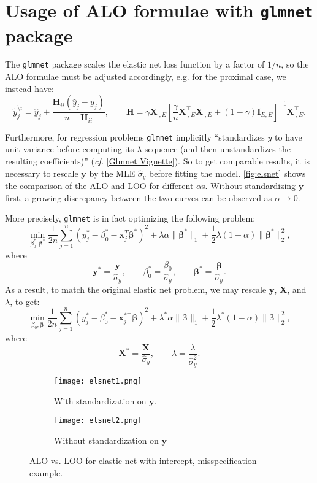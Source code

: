 \documentclass[11pt]{article}
\newcommand{\by}{\bm{y}}
\newcommand{\bH}{\bm{H}}
\newcommand{\bI}{\bm{I}}
\newcommand{\bX}{\bm{X}}
\newcommand{\bbeta}{\bm{\beta}}
\begin{document}
\section{Usage of ALO formulae with \texttt{glmnet} package}
The \verb|glmnet| package scales the elastic net loss function by a factor of \(1/n\), so the ALO formulae must be adjusted accordingly, e.g. for the proximal case, we instead have: \[\tilde{y}_j^{\setminus i}=\hat{y}_j+\frac{\bH_{ii}(\hat{y}_j-y_j)}{n-\bH_{ii}},\qquad\bH=\gamma\bX_{\cdot,E}\left[\frac{\gamma}{n}\bX_{\cdot,E}^\top\bX_{\cdot,E}+\left(1-\gamma\right)\bI_{E,E}\right]^{-1}\bX_{\cdot,E}^\top.\]

Furthermore, for regression problems \verb|glmnet| implicitly ``standardizes \(y\) to have unit variance before computing its \(\lambda\) sequence (and then unstandardizes the resulting coefficients)'' (\emph{cf.} [\href{https://web.stanford.edu/~hastie/glmnet/glmnet_alpha.html}{Glmnet Vignette}]). So to get comparable results, it is necessary to rescale \(\by\) by the MLE \(\hat{\sigma}_y\) before fitting the model. \autoref{fig:elsnet} shows the comparison of the ALO and LOO for different \(\alpha\)s. Without standardizing \(\by\) first, a growing discrepancy between the two curves can be observed as \(\alpha\to0\).

More precisely, \verb|glmnet| is in fact optimizing the following problem: 
	\begin{equation}
		\min_{\beta_0^\ast,\bm{\beta}^\ast}\frac{1}{2n}\sum_{j=1}^{n}\left(y_j^\ast-\beta_0^\ast-\bm{x}_j^T\bm{\beta}^\ast\right)^2+\lambda\alpha\|\bm{\beta}^\ast\|_1+\frac{1}{2}\lambda(1-\alpha)\|\bm{\beta}^\ast\|_2^2,
	\end{equation}
where \[\by^\ast=\frac{\by}{\hat{\sigma}_y},\qquad\beta_0^\ast=\frac{\beta_0}{\hat{\sigma}_y},\qquad\bbeta^\ast=\frac{\bbeta}{\hat{\sigma}_y}.\] As a result, to match the original elastic net problem, we may rescale \(\by\), \(\bX\), and \(\lambda\), to get:
\begin{equation}
	\min_{\beta_0,\bm{\beta}}\frac{1}{2n}\sum_{j=1}^{n}\left(y_j^\ast-\beta_0^\ast-\bm{x}_j^{\ast\top}\bm{\beta}\right)^2+\lambda^\ast\alpha\|\bm{\beta}\|_1+\frac{1}{2}\lambda^\ast(1-\alpha)\|\bm{\beta}\|_2^2,
\end{equation} 
where \[\bX^\ast=\frac{\bX}{\hat{\sigma}_y},\qquad\lambda=\frac{\lambda}{\hat{\sigma}_y^2}.\]
	\begin{figure}[!htbp]
	\centering
	\begin{subfigure}[b]{\textwidth}
		\texttt{[image: elsnet1.png]}
		\caption{With standardization on \(\by\).}
	\end{subfigure}
	\begin{subfigure}[b]{\textwidth}
		\texttt{[image: elsnet2.png]}
		\caption{Without standardization on \(\by\)}
	\end{subfigure}
	\caption{ALO vs. LOO for elastic net with intercept, misspecification example.\label{fig:elsnet}}
	\end{figure}
\end{document}
